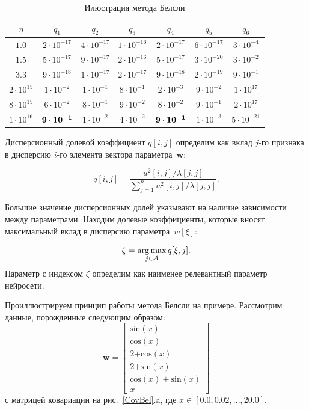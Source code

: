 \begin{table}[h]
\begin{center}
\caption{Илюстрация метода Белсли}
\begin{tabular}{|c|cccccc|}
\hline
$\eta$ & $q_1$& $q_2$& $q_3$& $q_4$& $q_5$& $q_6$\\
\hline
$1.0$ &  $2\cdot 10^{-17}$ &  $4\cdot 10^{-17}$ &  $1\cdot 10^{-16}$ &  $2\cdot 10^{-17}$ &  $6\cdot 10^{-17}$&  $3\cdot 10^{-4}$ \\
\hline
$1.5$ &  $5\cdot 10^{-17}$ &  $9\cdot 10^{-17}$ &  $2\cdot 10^{-16}$ &  $5\cdot 10^{-17}$ &  $3\cdot 10^{-20}$ &  $3\cdot 10^{-2}$ \\
\hline
$3.3$ &  $9\cdot 10^{-18}$ &  $1\cdot 10^{-17}$ &  $2\cdot 10^{-17}$ &  $9\cdot 10^{-18}$ &  $2\cdot 10^{-19}$ &  $9\cdot 10^{-1}$ \\
\hline
$2\cdot 10^{15}$ &  $1\cdot 10^{-2}$ &  $1\cdot 10^{-1}$ &  $8\cdot 10^{-1}$ &  $2\cdot 10^{-3}$ &  $9\cdot 10^{-2}$ &  $1\cdot 10^{17}$ \\ 
\hline
$8\cdot 10^{15}$ &  $6\cdot 10^{-2}$ &  $8\cdot 10^{-1}$ &  $9\cdot 10^{-2}$ &  $8\cdot 10^{-2}$ &  $9\cdot 10^{-1}$ & $ 2\cdot 10^{17} $\\
\hline
$1\cdot 10^{16}$ &  $\bf9\cdot 10^{-1}$ &  $1\cdot 10^{-2}$& $ 4\cdot 10^{-2}$&  $\bf9\cdot 10^{-1}$ &  $1\cdot 10^{-3}$ & $ 5\cdot 10^{-21}$ \\
\hline
\end{tabular}
\label{CovBelTable}
\end{center}
\end{table}

Дисперсионный долевой коэффициент $q[i,j]$ определим как вклад $j$-го признака в дисперсию $i$-го элемента вектора параметра~$\textbf{w}$:

$$q[i,j] = \frac{u^2[i,j]/\lambda[j,j]}{\sum^n_{j=1}{u^2[i,j]/\lambda[j,j]}}.$$

Большие значение дисперсионных долей указывают на наличие зависимости между параметрами. Находим долевые коэффициенты, которые вносят максимальный вклад в дисперсию параметра~$w[\xi]$:

$$\zeta = \operatorname*{arg\,max}_{j\in \mathcal{A}}{q[\xi,j]}. $$
Параметр с индексом $\zeta$ определим как наименее релевантный параметр нейросети. 

Проиллюстрируем принцип работы метода Белсли на примере. Рассмотрим данные, порожденные следующим образом: 
$$\textbf{w} = \begin{bmatrix}
\text{sin}(x)\\
\text{cos}(x)\\
\text{2+cos}(x)\\
\text{2+sin}(x)\\
\text{cos}(x) + \text{sin}(x)\\
x
\end{bmatrix}$$
с матрицей ковариации на рис.~\ref{CovBel}.a, где $x \in [0.0, 0.02, ..., 20.0]$.


